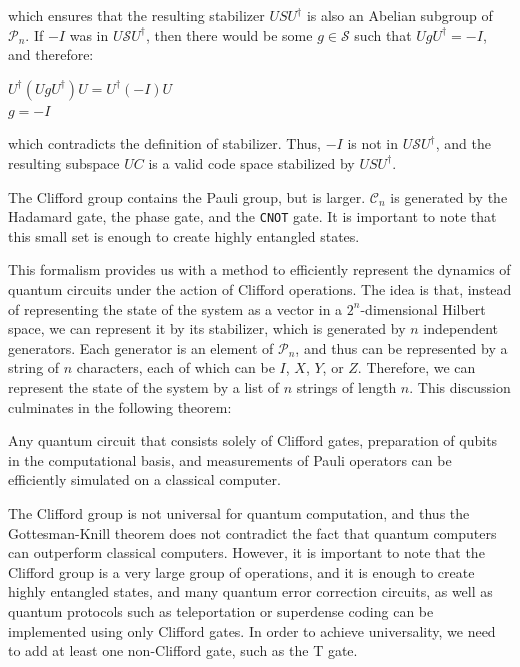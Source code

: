 \documentclass[12pt, twoside, openany]{book}
\begin{document}
which ensures that the resulting stabilizer $USU^\dagger$ is also an Abelian subgroup of $\mathcal{P}_n$. If $-I$ was in $U \mathcal{S} U^\dagger$, then there would be some $g \in \mathcal{S}$ such that $U g U^\dagger = -I$, and therefore:\\

\begin{centering}
    $ U^\dagger ( U g U^\dagger ) U = U^\dagger (-I)  U $ \\
    $ g = -I $ \\
\end{centering}

which contradicts the definition of stabilizer. Thus, $-I$ is not in $U \mathcal{S} U^\dagger$, and the resulting subspace $UC$ is a valid code space stabilized by $USU^\dagger$.

The Clifford group contains the Pauli group, but is larger. $\mathcal{C}_n$ is generated by the Hadamard gate, the phase gate, and the \texttt{CNOT} gate. It is important to note that this small set is enough to create highly entangled states.

This formalism provides us with a method to efficiently represent the dynamics of quantum circuits under the action of Clifford operations. The idea is that, instead of representing the state of the system as a vector in a $2^n$-dimensional Hilbert space, we can represent it by its stabilizer, which is generated by $n$ independent generators. Each generator is an element of $\mathcal{P}_n$, and thus can be represented by a string of $n$ characters, each of which can be $I$, $X$, $Y$, or $Z$. Therefore, we can represent the state of the system by a list of $n$ strings of length $n$. This discussion culminates in the following theorem:

\begin{theorem}
Any quantum circuit that consists solely of Clifford gates, preparation of qubits in the computational basis, and measurements of Pauli operators can be efficiently simulated on a classical computer.
\end{theorem}

The Clifford group is not universal for quantum computation, and thus the Gottesman-Knill theorem does not contradict the fact that quantum computers can outperform classical computers. However, it is important to note that the Clifford group is a very large group of operations, and it is enough to create highly entangled states, and many quantum error correction circuits, as well as quantum protocols such as teleportation or superdense coding can be implemented using only Clifford gates. In order to achieve universality, we need to add at least one non-Clifford gate, such as the T gate.
\end{document}
